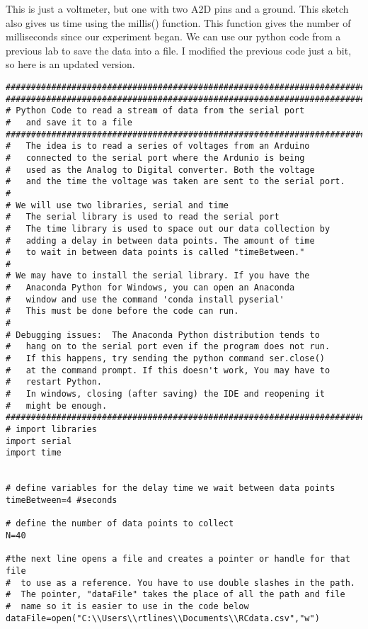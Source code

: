 This is just a voltmeter, but one with two A2D pins and a ground. This
sketch also gives us time using the millis() function. This function gives
the number of milliseconds since our experiment began. We can use our python
code from a previous lab to save the data into a file. I modified the
previous code just a bit, so here is an updated version.
\begin{verbatim}
###############################################################################
###############################################################################
# Python Code to read a stream of data from the serial port
#   and save it to a file
###############################################################################
#   The idea is to read a series of voltages from an Arduino 
#   connected to the serial port where the Ardunio is being 
#   used as the Analog to Digital converter. Both the voltage
#   and the time the voltage was taken are sent to the serial port.
#
# We will use two libraries, serial and time
#   The serial library is used to read the serial port
#   The time library is used to space out our data collection by
#   adding a delay in between data points. The amount of time 
#   to wait in between data points is called "timeBetween." 
#
# We may have to install the serial library. If you have the
#   Anaconda Python for Windows, you can open an Anaconda 
#   window and use the command 'conda install pyserial'
#   This must be done before the code can run.
#
# Debugging issues:  The Anaconda Python distribution tends to 
#   hang on to the serial port even if the program does not run. 
#   If this happens, try sending the python command ser.close()
#   at the command prompt. If this doesn't work, You may have to 
#   restart Python.
#   In windows, closing (after saving) the IDE and reopening it 
#   might be enough.
###############################################################################
# import libraries
import serial
import time
 
 
# define variables for the delay time we wait between data points
timeBetween=4 #seconds
 
# define the number of data points to collect
N=40
 
#the next line opens a file and creates a pointer or handle for that file
#  to use as a reference. You have to use double slashes in the path.
#  The pointer, "dataFile" takes the place of all the path and file
#  name so it is easier to use in the code below
dataFile=open("C:\\Users\\rtlines\\Documents\\RCdata.csv","w")
 

\end{verbatim}
